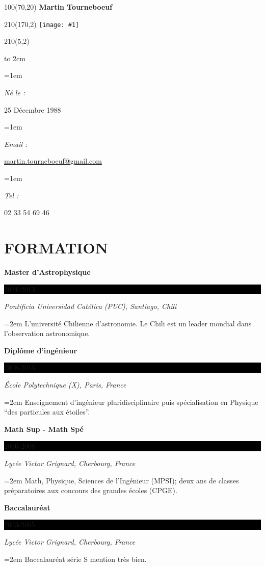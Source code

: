 \documentclass[paper=a4,fontsize=11pt]{scrartcl}	 			%
\newlength{\spacebox}
\newcommand{\sepspace}{\vspace*{1em}}			%
\newcommand{\MyName}[1]{ %
   \begin{textblock}{100}(70,20)\centering
          \huge\bfseries {#1}
   \end{textblock}  
      }
\newcommand{\MyFoto}[1]{ %
	\begin{textblock}{210}(170,2)
		\texttt{[image: \#1]}
	\end{textblock}  
	}
\newcommand{\MyData}[1]{ %
    \begin{textblock}{210}(5,2)
      { \vbox to 2cm { \vfill  { \flushleft  #1 }  }  }
    \end{textblock}  
    }
\newcommand{\NewPart}[1]{\section*{\uppercase{#1}}}
\newcommand{\PersonalEntry}[2]{
		\noindent\hangindent=1em\hangafter=0 		%
		\parbox{\spacebox}{						%
		   \textit{#1}}								%
		 #2 \par}					%
\newcommand{\EducationEntry}[4]{
		\noindent \textbf{#1} \hfill 					%
		\colorbox{Black}{%
			\parbox{4.5em}{%
			\hfill\color{White}#2}} \par				%
		\noindent \textit{#3} \par					%
		\noindent\hangindent=2em\hangafter=0 \small #4 	%
		\normalsize \par}
\begin{document}




\MyName{Martin Tourneboeuf}

\MyFoto{../Figure/martin2015.jpg}


\MyData
{
\PersonalEntry{Né le :}   {25 Décembre 1988} 
\PersonalEntry{Email :}{\url{martin.tourneboeuf@gmail.com}}
\PersonalEntry{Tel :}  {02 33 54 69 46} 
}





% 
%    
    

  
  
  


\NewPart{Formation}{} 



\EducationEntry{Master d'Astrophysique}{2011-2013}{Pontificia Universidad Cat\'olica (PUC), Santiago, Chili}
    { L'université Chilienne d'astronomie. 
    Le Chili est un leader mondial dans l'observation astronomique. }

\EducationEntry{Diplôme d'ingénieur}{2008-2013}{\'Ecole Polytechnique (X), Paris, France}
    {Enseignement d'ingénieur pluridisciplinaire puis spécialisation en Physique 
    ``des particules aux étoiles''.}



\EducationEntry{Math Sup - Math Spé}{2006-2008}{Lyc\'ee Victor Grignard, Cherbourg, France}
{Math, Physique, Sciences de l'Ingénieur (MPSI);
 deux ans de classes préparatoires aux concours des grandes écoles (CPGE).
}


\EducationEntry{Baccalaur\'eat}{2003-2005}{Lyc\'ee Victor Grignard, Cherbourg, France}
{Baccalauréat série S mention très bien. 
}
\end{document}
